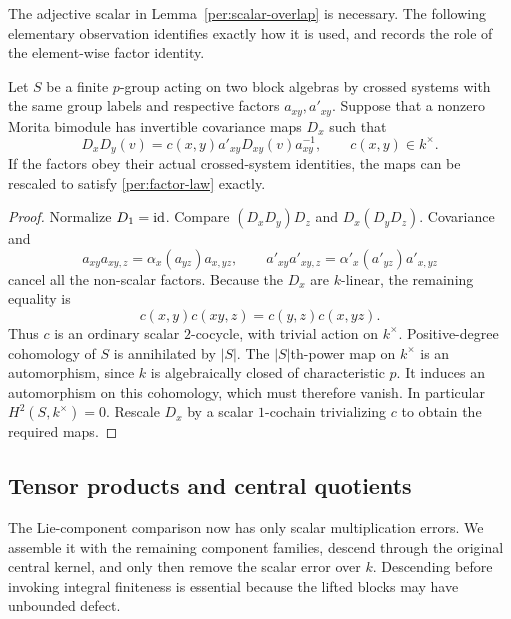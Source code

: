 The adjective scalar in Lemma~\ref{per:scalar-overlap} is necessary.
The following elementary observation identifies exactly how it is
used, and records the role of the element-wise factor identity.

\begin{lemma}\label{per:scalar-cocycle}
Let $S$ be a finite $p$-group acting on two block algebras by crossed
systems with the same group labels and respective factors
$a_{xy},a'_{xy}$.  Suppose that a nonzero Morita bimodule has
invertible covariance maps $D_x$ such that
\[
 D_xD_y(v)=c(x,y)a'_{xy}D_{xy}(v)a_{xy}^{-1},
       \qquad c(x,y)\in k^\times.
\]
If the factors obey their actual crossed-system identities, the
maps can be rescaled to satisfy \eqref{per:factor-law} exactly.
\end{lemma}

\begin{proof}
Normalize $D_1=\operatorname{id}$.  Compare $(D_xD_y)D_z$ and $D_x(D_yD_z)$.
Covariance and
\[
 a_{xy}a_{xy,z}=\alpha_x(a_{yz})a_{x,yz},
 \qquad
 a'_{xy}a'_{xy,z}=\alpha'_x(a'_{yz})a'_{x,yz}
\]
cancel all the non-scalar factors.  Because the $D_x$ are
$k$-linear, the remaining equality is
\[
 c(x,y)c(xy,z)=c(y,z)c(x,yz).
\]
Thus $c$ is an ordinary scalar $2$-cocycle, with trivial action on
$k^\times$.  Positive-degree cohomology of $S$ is annihilated by
$|S|$.  The $|S|$th-power map on $k^\times$ is an automorphism,
since $k$ is algebraically closed of characteristic $p$.
It induces an automorphism on this cohomology, which must therefore
vanish.  In particular $H^2(S,k^\times)=0$.  Rescale $D_x$ by a
scalar $1$-cochain trivializing $c$ to obtain the required maps.
\end{proof}

\subsection{Tensor products and central quotients}

The Lie-component comparison now has only scalar multiplication
errors.  We assemble it with the remaining component families,
descend through the original central kernel, and only then remove
the scalar error over $k$.  Descending before invoking integral
finiteness is essential because the lifted blocks may have
unbounded defect.

